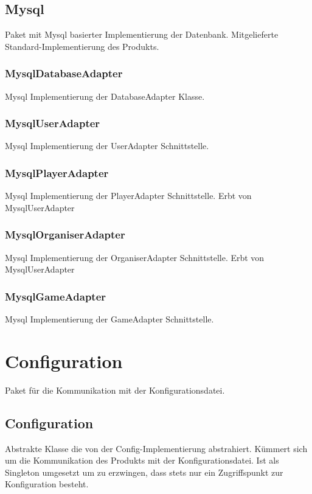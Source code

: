 \documentclass[a4paper]{scrreprt}
\begin{document}
    \subsection{Mysql}
    Paket mit Mysql basierter Implementierung der Datenbank.
    Mitgelieferte Standard-Implementierung des Produkts.

    \subsubsection{MysqlDatabaseAdapter}
    Mysql Implementierung der DatabaseAdapter Klasse.

    \subsubsection{MysqlUserAdapter}
    Mysql Implementierung der UserAdapter Schnittstelle.

    \subsubsection{MysqlPlayerAdapter}
    Mysql Implementierung der PlayerAdapter Schnittstelle.
    Erbt von MysqlUserAdapter

    \subsubsection{MysqlOrganiserAdapter}
    Mysql Implementierung der OrganiserAdapter Schnittstelle.
    Erbt von MysqlUserAdapter

    \subsubsection{MysqlGameAdapter}
    Mysql Implementierung der GameAdapter Schnittstelle.

    \section{Configuration}
    Paket für die Kommunikation mit der Konfigurationsdatei.

    \subsection{Configuration}
    Abstrakte Klasse die von der Config-Implementierung abstrahiert.
    Kümmert sich um die Kommunikation des Produkts mit der Konfigurationsdatei.
    Ist als Singleton umgesetzt um zu erzwingen, dass stets nur ein Zugriffspunkt zur Konfiguration besteht.
\end{document}
